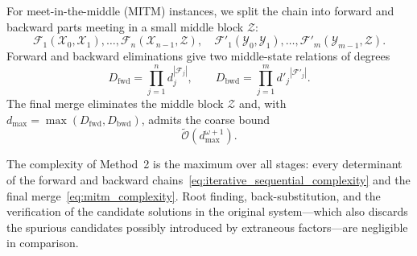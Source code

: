 For meet-in-the-middle (MITM) instances, we split the chain into forward and backward parts meeting in a small middle block $\mathcal{Z}$:
\begin{equation}
\mathcal{F}_1(\mathcal{X}_0,\mathcal{X}_1),\ldots,\mathcal{F}_{n}(\mathcal{X}_{n-1},\mathcal{Z}),
\quad
\mathcal{F}'_1(\mathcal{Y}_0,\mathcal{Y}_1),\ldots,\mathcal{F}'_{m}(\mathcal{Y}_{m-1},\mathcal{Z}).
\label{eq:iterative_mitm_chain}
\end{equation}
Forward and backward eliminations give two middle-state relations of degrees
\[
D_{\mathrm{fwd}}=\prod_{j=1}^{n} d_j^{|\mathcal{F}_j|}, \qquad
D_{\mathrm{bwd}}=\prod_{j=1}^{m} {d'_j}^{|\mathcal{F}'_j|}.
\]
The final merge eliminates the middle block $\mathcal{Z}$ and, with $d_{\max}=\max(D_{\mathrm{fwd}},D_{\mathrm{bwd}})$, admits the coarse bound
\begin{equation}
\widetilde{\mathcal{O}}\!\left(d_{\max}^{\omega+1}\right).
\label{eq:mitm_complexity}
\end{equation}

The complexity of Method~2 is the maximum over all stages: every determinant of the forward and backward chains~\eqref{eq:iterative_sequential_complexity} and the final merge~\eqref{eq:mitm_complexity}. Root finding, back-substitution, and the verification of the candidate solutions in the original system---which also discards the spurious candidates possibly introduced by extraneous factors---are negligible in comparison.

